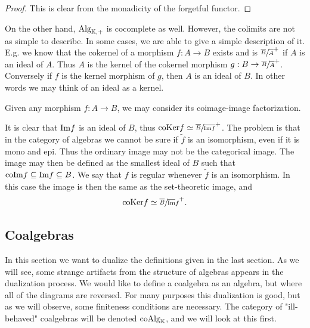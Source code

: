 \documentclass[../thesis.tex]{subfiles}
\begin{document}
                \begin{proof}
                    This is clear from the monadicity of the forgetful functor.
                \end{proof}

                On the other hand, $\tt{Alg}_{\mathbb{K},+}$ is cocomplete as well. However, the colimits are not as simple to describe. In some cases, we are able to give a simple description of it. E.g. we know that the cokernel of a morphism $f : A \rightarrow B$ exists and is $\sfrac{\overline{B}}{\overline{A}}^+$ if $A$ is an ideal of $A$. Thus $A$ is the kernel of the cokernel morphism $g : B \rightarrow \sfrac{\overline{B}}{\overline{A}}^+$. Conversely if $f$ is the kernel morphism of $g$, then $A$ is an ideal of $B$. In other words we may think of an ideal as a kernel.
                
                Given any morphism $f : A \rightarrow B$, we may consider its coimage-image factorization.
                \begin{center}
                \end{center}
                It is clear that $\tt{Im}f$ is an ideal of $B$, thus $\tt{coKer}f \simeq \sfrac{\overline{B}}{\overline{\tt{Im}f}}^+$. The problem is that in the category of algebras we cannot be sure if $\widetilde{f}$ is an isomorphism, even if it is mono and epi. Thus the ordinary image may not be the categorical image. The image may then be defined as the smallest ideal of $B$ such that $\tt{coIm}f \subseteq \tt{Im}f \subseteq B$. We say that $f$ is regular whenever $\widetilde{f}$ is an isomorphism. In this case the image is then the same as the set-theoretic image, and
                \begin{align*}
                    \tt{coKer}f \simeq \sfrac{\overline{B}}{\overline{\tt{Im}}f}^+\tt{.}
                \end{align*}

    \subsection{Coalgebras}
            In this section we want to dualize the definitions given in the last section. As we will see, some strange artifacts from the structure of algebras appears in the dualization process. We would like to define a coalgebra as an algebra, but where all of the diagrams are reversed. For many purposes this dualization is good, but as we will observe, some finiteness conditions are necessary. The category of "ill-behaved" coalgebras will be denoted $\tt{coAlg}_\mathbb{K}$, and we will look at this first.
\end{document}

